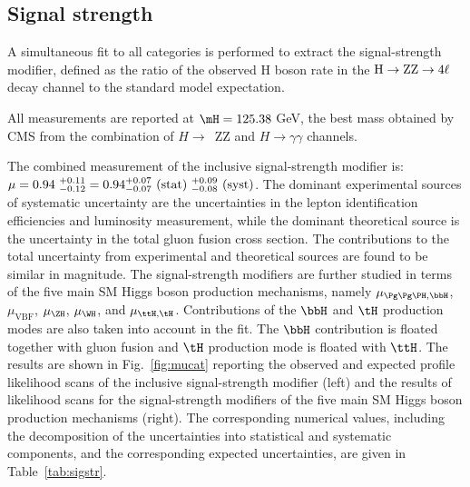 \subsection{Signal strength}
\label{subsec:signalstrenghts}

A simultaneous fit to all categories is performed to extract the signal-strength modifier,
defined as the ratio of the observed H boson rate in the $\mathrm{H}\rightarrow{\rm Z}{\rm Z}\rightarrow4\ell$ decay channel to the standard model expectation.

All measurements are reported at $\mH=125.38$ GeV, the best mass obtained by CMS from the combination of $H\rightarrow$~ZZ and $H\rightarrow\gamma\gamma$ channels.

The combined measurement of the inclusive signal-strength modifier is: %
$\mu = 0.94~^{+0.11}_{-0.12} = 0.94^{+0.07}_{-0.07}~({\rm stat})~^{+0.09}_{-0.08}~({\rm syst})$.
The dominant experimental sources of systematic uncertainty are the uncertainties in the lepton identification efficiencies and luminosity measurement, while the dominant theoretical source is the uncertainty in the total gluon fusion cross section.
The contributions to the total uncertainty from experimental and theoretical sources are found to be similar in magnitude.
The signal-strength modifiers are further studied in terms of the five main SM Higgs boson production mechanisms, namely $\mu_{\Pg\Pg\PH,\bbH}$, $\mu_{\mathrm{VBF}}$, $\mu_{\ZH}$, $\mu_{\WH}$, and $\mu_{\ttH,\tH}$.
Contributions of the $\bbH$ and $\tH$ production modes are also taken into account in the fit.
The $\bbH$ contribution is floated together with gluon fusion and $\tH$ production mode is floated with $\ttH$.
The results are shown in Fig.~\ref{fig:mucat} reporting the observed and expected profile likelihood scans of the inclusive signal-strength modifier (left) and the results of likelihood scans for the signal-strength modifiers of the five main SM Higgs boson production mechanisms (right).
The corresponding numerical values, including the decomposition of the uncertainties into statistical and systematic components, and the corresponding expected uncertainties, are given in Table~\ref{tab:sigstr}.

